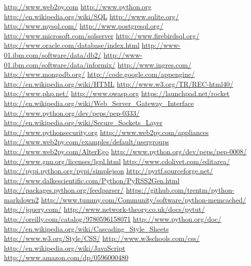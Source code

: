 \documentclass[justified,sixbynine,notoc]{tufte-book}
\begin{document}
\begin{thebibliography}{999}
 \url{http://www.web2py.com}
 \url{http://www.python.org}
 \url{http://en.wikipedia.org/wiki/SQL}
 \url{http://www.sqlite.org/}
 \url{http://www.mysql.com/}
 \url{http://www.postgresql.org/}
 \url{http://www.microsoft.com/sqlserver}
 \url{http://www.firebirdsql.org/}
 \url{http://www.oracle.com/database/index.html}
 \url{http://www-01.ibm.com/software/data/db2/}
 \url{http://www-01.ibm.com/software/data/informix/}
 \url{http://www.ingres.com/}
 \url{http://www.mongodb.org/}
 \url{http://code.google.com/appengine/}
 \url{http://en.wikipedia.org/wiki/HTML}
 \url{http://www.w3.org/TR/REC-html40/}
 \url{http://www.php.net/}
 \url{http://www.owasp.org}
 \url{https://launchpad.net/rocket}
 \url{http://en.wikipedia.org/wiki/Web_Server_Gateway_Interface}
 \url{http://www.python.org/dev/peps/pep-0333/}
 \url{http://en.wikipedia.org/wiki/Secure_Sockets_Layer}
 \url{http://www.pythonsecurity.org}
 \url{http://www.web2py.com/appliances}
 \url{http://www.web2py.com/examples/default/usergroups}
 \url{http://www.web2py.com/AlterEgo}
 \url{http://www.python.org/dev/peps/pep-0008/}
 \url{http://www.gnu.org/licenses/lgpl.html}
 \url{http://www.cdolivet.com/editarea/}
 \url{http://pypi.python.org/pypi/simplejson}
 \url{http://pyrtf.sourceforge.net/}
 \url{http://www.dalkescientific.com/Python/PyRSS2Gen.html}
 \url{http://packages.python.org/feedparser/}
 \url{https://github.com/trentm/python-markdown2}
 \url{http://www.tummy.com/Community/software/python-memcached/}
 \url{http://jquery.com/}
 \url{http://www.network-theory.co.uk/docs/pytut/}
 \url{http://oreilly.com/catalog/9780596158071}
 \url{http://www.python.org/doc/}
 \url{http://en.wikipedia.org/wiki/Cascading_Style_Sheets}
 \url{http://www.w3.org/Style/CSS/}
 \url{http://www.w3schools.com/css/}
 \url{http://en.wikipedia.org/wiki/JavaScript}
 \url{http://www.amazon.com/dp/0596000480}

\end{thebibliography}
\end{document}
